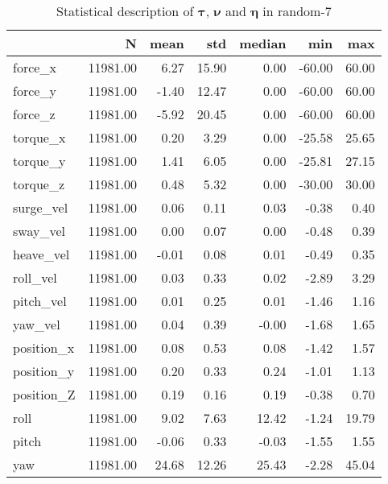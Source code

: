 \begin{table}[hb]
\centering
\caption{Statistical description of $\boldsymbol{\tau}$, $\boldsymbol{\nu}$ and $\boldsymbol{\eta}$ in random-7}
\label{tab:description-random-7}
\begin{tabular}{lrrrrrr}
\toprule
{} &        N &  mean &   std & median &    min &   max \\
\midrule
force\_x    & 11981.00 &  6.27 & 15.90 &   0.00 & -60.00 & 60.00 \\
force\_y    & 11981.00 & -1.40 & 12.47 &   0.00 & -60.00 & 60.00 \\
force\_z    & 11981.00 & -5.92 & 20.45 &   0.00 & -60.00 & 60.00 \\
torque\_x   & 11981.00 &  0.20 &  3.29 &   0.00 & -25.58 & 25.65 \\
torque\_y   & 11981.00 &  1.41 &  6.05 &   0.00 & -25.81 & 27.15 \\
torque\_z   & 11981.00 &  0.48 &  5.32 &   0.00 & -30.00 & 30.00 \\
surge\_vel  & 11981.00 &  0.06 &  0.11 &   0.03 &  -0.38 &  0.40 \\
sway\_vel   & 11981.00 &  0.00 &  0.07 &   0.00 &  -0.48 &  0.39 \\
heave\_vel  & 11981.00 & -0.01 &  0.08 &   0.01 &  -0.49 &  0.35 \\
roll\_vel   & 11981.00 &  0.03 &  0.33 &   0.02 &  -2.89 &  3.29 \\
pitch\_vel  & 11981.00 &  0.01 &  0.25 &   0.01 &  -1.46 &  1.16 \\
yaw\_vel    & 11981.00 &  0.04 &  0.39 &  -0.00 &  -1.68 &  1.65 \\
position\_x & 11981.00 &  0.08 &  0.53 &   0.08 &  -1.42 &  1.57 \\
position\_y & 11981.00 &  0.20 &  0.33 &   0.24 &  -1.01 &  1.13 \\
position\_Z & 11981.00 &  0.19 &  0.16 &   0.19 &  -0.38 &  0.70 \\
roll       & 11981.00 &  9.02 &  7.63 &  12.42 &  -1.24 & 19.79 \\
pitch      & 11981.00 & -0.06 &  0.33 &  -0.03 &  -1.55 &  1.55 \\
yaw        & 11981.00 & 24.68 & 12.26 &  25.43 &  -2.28 & 45.04 \\
\bottomrule
\end{tabular}
\end{table}
